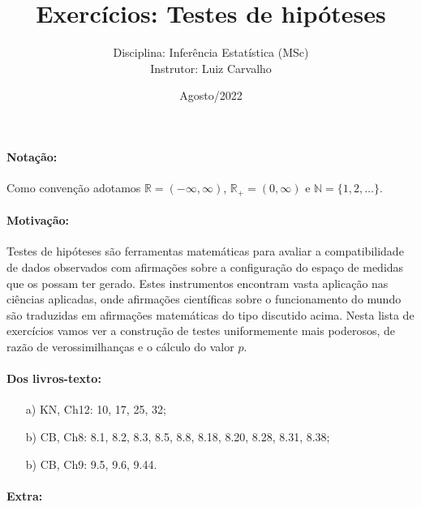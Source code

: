 \documentclass[a4paper,10pt, notitlepage]{report}
\title{Exercícios: Testes de hipóteses}
\author{Disciplina: Inferência Estatística (MSc) \\ Instrutor: Luiz Carvalho}
\date{Agosto/2022}
\newcommand{\rpl}{\mathbb{R}_+}
\begin{document}
\maketitle


\paragraph{Notação:} Como convenção adotamos $\mathbb{R} = (-\infty, \infty)$, $\rpl = (0, \infty)$ e $\mathbb{N} = \{1, 2, \ldots \}$.

\paragraph{Motivação:} Testes de hipóteses são ferramentas matemáticas para avaliar a compatibilidade de dados observados com afirmações sobre a configuração do espaço de medidas que os possam ter gerado. 
Estes instrumentos encontram vasta aplicação nas ciências aplicadas, onde afirmações científicas sobre o funcionamento do mundo são traduzidas em afirmações matemáticas do tipo discutido acima. 
Nesta lista de exercícios vamos ver a construção de testes uniformemente mais poderosos, de razão de verossimilhanças e o cálculo do valor $p$.

\paragraph{Dos livros-texto:}

\begin{itemize}
    \item[a)] KN, Ch12: 10, 17, 25, 32;  
    \item[b)] CB, Ch8: 8.1, 8.2, 8.3, 8.5, 8.8, 8.18, 8.20, 8.28, 8.31, 8.38;
    \item[b)] CB, Ch9: 9.5, 9.6, 9.44.
\end{itemize}

\paragraph{Extra:}
\end{document}
